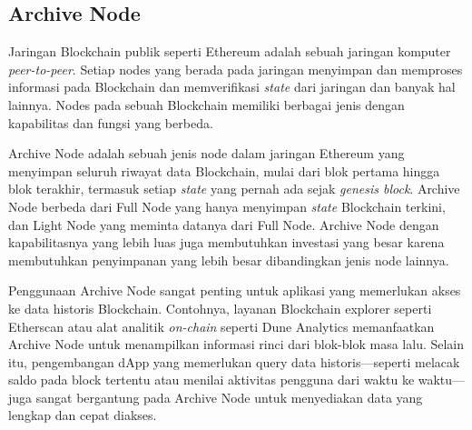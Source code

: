 \subsection{Archive Node}
\label{subsec:archive-node}

Jaringan Blockchain publik seperti Ethereum adalah sebuah jaringan komputer \textit{peer-to-peer}. Setiap nodes yang berada pada jaringan menyimpan dan memproses informasi pada Blockchain dan memverifikasi \textit{state} dari jaringan dan banyak hal lainnya. Nodes pada sebuah Blockchain memiliki berbagai jenis dengan kapabilitas dan fungsi yang berbeda.

Archive Node adalah sebuah jenis node dalam jaringan Ethereum yang menyimpan seluruh riwayat data Blockchain, mulai dari blok pertama hingga blok terakhir, termasuk setiap \textit{state} yang pernah ada sejak \textit{genesis block}. Archive Node berbeda dari Full Node yang hanya menyimpan \textit{state} Blockchain terkini, dan Light Node yang meminta datanya dari Full Node. Archive Node dengan kapabilitasnya yang lebih luas juga membutuhkan investasi yang besar karena membutuhkan penyimpanan yang lebih besar dibandingkan jenis node lainnya.

Penggunaan Archive Node sangat penting untuk aplikasi yang memerlukan akses ke data historis Blockchain. Contohnya, layanan Blockchain explorer seperti Etherscan atau alat analitik \textit{on-chain} seperti Dune Analytics memanfaatkan Archive Node untuk menampilkan informasi rinci dari blok-blok masa lalu. Selain itu, pengembangan dApp yang memerlukan query data historis—seperti melacak saldo pada block tertentu atau menilai aktivitas pengguna dari waktu ke waktu—juga sangat bergantung pada Archive Node untuk menyediakan data yang lengkap dan cepat diakses.
